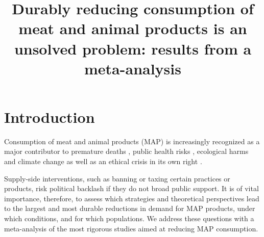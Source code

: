 \documentclass[sn-nature,pdflatex]{sn-jnl}
\begin{document}
\title[MAP-reduction-meta]{Durably reducing consumption of meat and
animal products is an unsolved problem: results from a meta-analysis}


\author*[1]{  }

\author[1]{  }

\author[2]{  }








\maketitle

\section{Introduction}\label{sec1}

Consumption of meat and animal products (MAP) is increasingly recognized
as a major contributor to premature deaths
\citep{willett2019, landry2023}, public health risks
\citep{slingenbergh2004, graham2008}, ecological harms
\citep{greger2010} and climate change
\citep{scarborough2023, koneswaran2008} as well as an ethical crisis in
its own right \citep{kuruc2023, singer2023}.

Supply-side interventions, such as banning or taxing certain practices
or products, risk political backlash if they do not broad public
support. It is of vital importance, therefore, to assess which
strategies and theoretical perspectives lead to the largest and most
durable reductions in demand for MAP products, under which conditions,
and for which populations. We address these questions with a
meta-analysis of the most rigorous studies aimed at reducing MAP
consumption.
\end{document}
